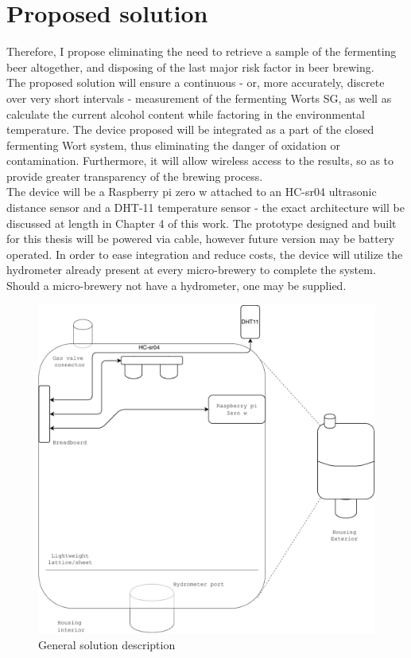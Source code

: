 \documentclass[twoside]{ctuthesis}
\theoremstyle{plain}
\theoremstyle{definition}
\theoremstyle{note}
\begin{document}
\section{Proposed solution}
Therefore, I propose eliminating the need to retrieve a sample of the fermenting beer altogether, and disposing of the last major risk factor in beer brewing.\\
The proposed solution will ensure a continuous - or, more accurately, discrete over very short intervals - measurement of the fermenting Worts SG, as well as calculate the current alcohol content while factoring in the environmental temperature. The device proposed will be integrated as a part of the closed fermenting Wort system, thus eliminating the danger of oxidation or contamination. Furthermore, it will allow wireless access to the results, so as to provide greater transparency of the brewing process.\\
The device will be a Raspberry pi zero w attached to an HC-sr04 ultrasonic distance sensor and a DHT-11 temperature sensor - the exact architecture will be discussed at length in Chapter 4 of this work. The prototype designed and built for this thesis will be powered via cable, however future version may be battery operated. In order to ease integration and reduce costs, the device will utilize the hydrometer already present at every micro-brewery to complete the system. Should a micro-brewery not have a hydrometer, one may be supplied.\\

\begin{figure}[H]
	\centering
	\includegraphics[scale=0.4]{Housing}
	\caption{General solution description}
\end{figure}
\end{document}
